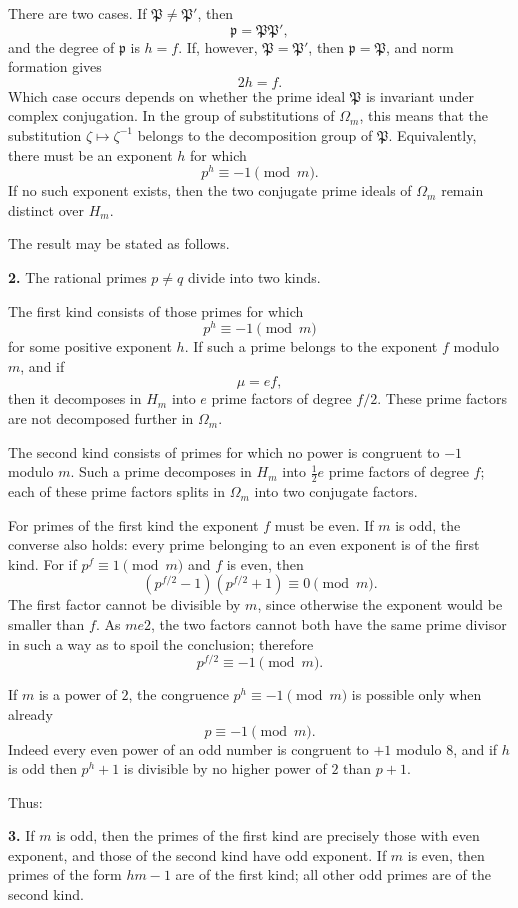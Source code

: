 \documentclass[12pt,a4paper]{article}
\newcommand{\Om}{\Omega_m}
\newcommand{\Hm}{H_m}
\newcommand{\zetaS}{\zeta}
\newcommand{\idealp}{\mathfrak p}
\begin{document}
There are two cases.  If \(\mathfrak P\ne\mathfrak P'\), then
\[
  \idealp=\mathfrak P\mathfrak P',
\]
and the degree of \(\idealp\) is \(h=f\).  If, however, \(\mathfrak P=\mathfrak P'\), then \(\idealp=\mathfrak P\), and norm formation gives
\[
  2h=f.
\]
Which case occurs depends on whether the prime ideal \(\mathfrak P\) is invariant under complex conjugation.  In the group of substitutions of \(\Om\), this means that the substitution \(\zetaS\mapsto\zetaS^{-1}\) belongs to the decomposition group of \(\mathfrak P\).  Equivalently, there must be an exponent \(h\) for which
\[
  p^h\equiv -1\pmod m.
\tag{1}
\]
If no such exponent exists, then the two conjugate prime ideals of \(\Om\) remain distinct over \(\Hm\).

The result may be stated as follows.

\textbf{2.} The rational primes \(p\ne q\) divide into two kinds.

The first kind consists of those primes for which
\[
  p^h\equiv -1\pmod m
\]
for some positive exponent \(h\).  If such a prime belongs to the exponent \(f\) modulo \(m\), and if
\[
  \mu=ef,
\]
then it decomposes in \(\Hm\) into \(e\) prime factors of degree \(f/2\).  These prime factors are not decomposed further in \(\Om\).

The second kind consists of primes for which no power is congruent to \(-1\) modulo \(m\).  Such a prime decomposes in \(\Hm\) into \(\frac12e\) prime factors of degree \(f\); each of these prime factors splits in \(\Om\) into two conjugate factors.

For primes of the first kind the exponent \(f\) must be even.  If \(m\) is odd, the converse also holds: every prime belonging to an even exponent is of the first kind.  For if \(p^f\equiv1\pmod m\) and \(f\) is even, then
\[
  (p^{f/2}-1)(p^{f/2}+1)\equiv0\pmod m.
\]
The first factor cannot be divisible by \(m\), since otherwise the exponent would be smaller than \(f\).  As \(m
e2\), the two factors cannot both have the same prime divisor in such a way as to spoil the conclusion; therefore
\[
  p^{f/2}\equiv -1\pmod m.
\]

If \(m\) is a power of \(2\), the congruence \(p^h\equiv-1\pmod m\) is possible only when already
\[
  p\equiv -1\pmod m.
\]
Indeed every even power of an odd number is congruent to \(+1\) modulo \(8\), and if \(h\) is odd then \(p^h+1\) is divisible by no higher power of \(2\) than \(p+1\).

Thus:

\textbf{3.} If \(m\) is odd, then the primes of the first kind are precisely those with even exponent, and those of the second kind have odd exponent.  If \(m\) is even, then primes of the form \(hm-1\) are of the first kind; all other odd primes are of the second kind.
\end{document}
